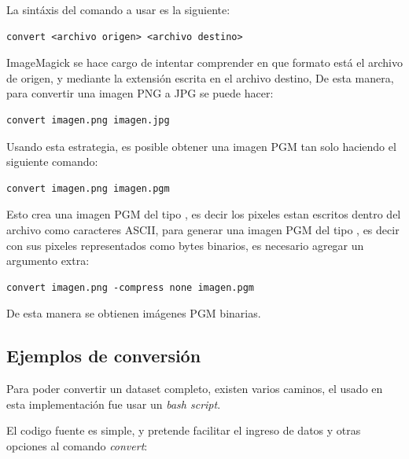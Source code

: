 La sintáxis del comando a usar es la siguiente:

\begin{verbatim}
convert <archivo origen> <archivo destino>
\end{verbatim}

ImageMagick se hace cargo de intentar comprender en que formato está el archivo de origen, y mediante la extensión escrita en el archivo destino, De esta manera, para convertir una imagen PNG a JPG se puede hacer:

\begin{verbatim}
convert imagen.png imagen.jpg
\end{verbatim}

Usando esta estrategia, es posible obtener una imagen PGM tan solo haciendo el siguiente comando:

\begin{verbatim}
convert imagen.png imagen.pgm
\end{verbatim}

Esto crea una imagen PGM del tipo , es decir los pixeles estan escritos dentro del archivo como caracteres ASCII, para generar una imagen PGM del tipo , es decir con sus pixeles representados como bytes binarios, es necesario agregar un argumento extra:

\begin{verbatim}
convert imagen.png -compress none imagen.pgm
\end{verbatim}

De esta manera se obtienen imágenes PGM binarias.

\subsection{Ejemplos de conversión}
\label{ch:implementacion:sec:ejemplosdeconversion}

Para poder convertir un dataset completo, existen varios caminos, el usado en esta implementación fue usar un \emph{bash script}.

El codigo fuente es simple, y pretende facilitar el ingreso de datos y otras opciones al comando \emph{convert}:

